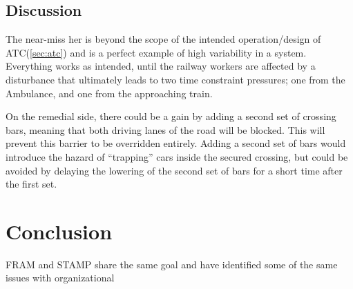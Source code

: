 \documentclass[10pt,oneside]{book}                  %
\begin{document}
\section{Discussion}

The near-miss her is beyond the scope of the intended operation/design of ATC(\ref{sec:atc}) and is a perfect example of high variability in a system. Everything works as intended, until the railway workers are affected by a disturbance that ultimately leads to two time constraint pressures; one from the Ambulance, and one from the approaching train.

On the remedial side, there could be a gain by adding a second set of crossing bars, meaning that both driving lanes of the road will be blocked. This will prevent this barrier to be overridden entirely. Adding a second set of bars would introduce the hazard of ``trapping'' cars inside the secured crossing, but could be avoided by delaying the lowering of the second set of bars for a short time after the first set.


\chapter{Conclusion}
FRAM and STAMP share the same goal and have identified some of the same issues with organizational 

\appendix
\backmatter
{}
\listoffigures
{}
\renewcommand{\sectionmark}[1]{\markright{#1}}
\sectionmark{Bibliography}
\end{document}
